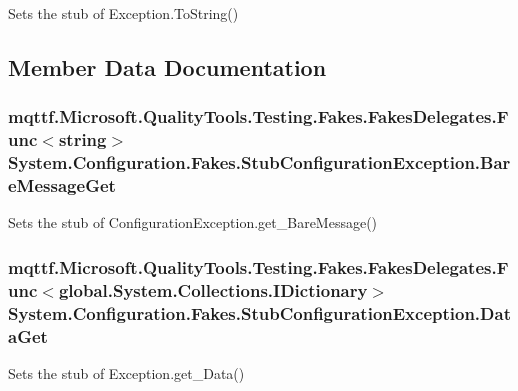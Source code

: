 Sets the stub of Exception.\-To\-String()



\subsection{Member Data Documentation}
\hypertarget{class_system_1_1_configuration_1_1_fakes_1_1_stub_configuration_exception_af867dd8562d4d5ddfd6b52d61b7f1c69}{
\subsubsection[{Bare\-Message\-Get}]{\setlength{\rightskip}{0pt plus 5cm}mqttf.\-Microsoft.\-Quality\-Tools.\-Testing.\-Fakes.\-Fakes\-Delegates.\-Func$<$string$>$ System.\-Configuration.\-Fakes.\-Stub\-Configuration\-Exception.\-Bare\-Message\-Get}}\label{class_system_1_1_configuration_1_1_fakes_1_1_stub_configuration_exception_af867dd8562d4d5ddfd6b52d61b7f1c69}


Sets the stub of Configuration\-Exception.\-get\-\_\-\-Bare\-Message()

\hypertarget{class_system_1_1_configuration_1_1_fakes_1_1_stub_configuration_exception_a288951ec9f04cef4bb671683eaa4bfc7}{
\subsubsection[{Data\-Get}]{\setlength{\rightskip}{0pt plus 5cm}mqttf.\-Microsoft.\-Quality\-Tools.\-Testing.\-Fakes.\-Fakes\-Delegates.\-Func$<$global.\-System.\-Collections.\-I\-Dictionary$>$ System.\-Configuration.\-Fakes.\-Stub\-Configuration\-Exception.\-Data\-Get}}\label{class_system_1_1_configuration_1_1_fakes_1_1_stub_configuration_exception_a288951ec9f04cef4bb671683eaa4bfc7}


Sets the stub of Exception.\-get\-\_\-\-Data()

